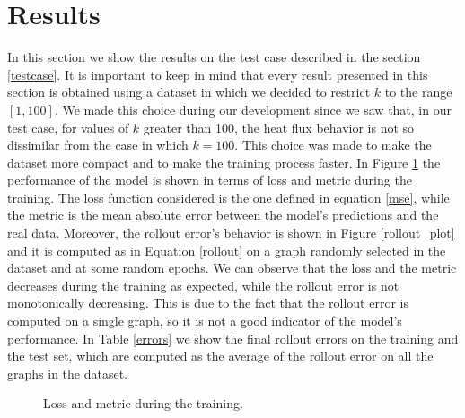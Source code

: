 \documentclass[11pt,a4paper]{article}
\begin{document}
\section{Results}
\label{results}
In this section we show the results on the test case described in the section \ref{testcase}. It is important to keep in mind that every result presented in this section is obtained using a dataset in which we decided to restrict \(k\) to the range \([1,100]\). We made this choice during our development since we saw that, in our test case, for values of \(k\) greater than 100, the heat flux behavior is not so dissimilar from the case in which \(k=100\).
This choice was made to make the dataset more compact and to make the training process faster.
In Figure \ref{loss} the performance of the model is shown in terms of loss and metric during the training. 
The loss function considered is the one defined in equation \eqref{mse}, while the metric is the mean absolute error between the model's predictions and the real data. 
Moreover, the rollout error's behavior is shown in Figure \ref{rollout_plot} and it is computed as in Equation \eqref{rollout} on a graph randomly selected in the dataset and at some random epochs. We can observe that the loss and the metric decreases during the training as expected, while the rollout error is not monotonically decreasing. This is due to the fact that the rollout error is computed on a single graph, so it is not a good indicator of the model's performance.
In Table \ref{errors} we show the final rollout errors on the training and the test set, which are computed as the average of the rollout error on all the graphs in the dataset.

\begin{figure}[H]
    \centering
    \caption{Loss and metric during the training.}
    \label{loss}
\end{figure}
\end{document}

